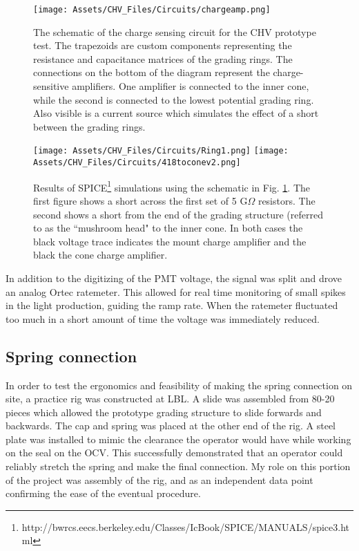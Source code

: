 \begin{figure}
    \centering
    \texttt{[image: Assets/CHV\_Files/Circuits/chargeamp.png]}
    \caption[The schematic of the  charge sensing circuit for the CHV prototype test. ]%
    {The schematic of the  charge sensing circuit for the CHV prototype test. 
    The trapezoids are custom components representing the resistance and capacitance matrices of the grading rings.
    The connections on the bottom of the diagram represent the charge-sensitive amplifiers.
    One amplifier is connected to the inner cone, while the second is connected to the lowest potential grading ring.
    Also visible is a current source which simulates the effect of a short between the grading rings.
    }
    \label{fig:charge_sensing_circuit}
\end{figure}
\begin{figure}
    \centering
    \texttt{[image: Assets/CHV\_Files/Circuits/Ring1.png]}
        \texttt{[image: Assets/CHV\_Files/Circuits/418toconev2.png]}

    \caption[Results of SPICE simulations using the schematic in Fig. \ref{fig:charge_sensing_circuit}.]%
    {Results of SPICE\footnote{http://bwrcs.eecs.berkeley.edu/Classes/IcBook/SPICE/MANUALS/spice3.html} simulations using the schematic in Fig. \ref{fig:charge_sensing_circuit}.
    The first figure shows a short across the first set of 5 G$\Omega$ resistors.
    The second shows a short from the end of the grading structure (referred to as the ``mushroom head" to the inner cone. 
    In both cases the black voltage trace indicates the mount charge amplifier and the black the cone charge amplifier. 
    }
    \label{fig:chargeamp_sims}
\end{figure}

In addition to the digitizing of the PMT voltage, the signal was split and drove an analog  Ortec ratemeter.
This allowed for real time monitoring of small spikes in the light production, guiding the ramp rate.
When the ratemeter fluctuated too much in a short amount of time the voltage was immediately reduced.

\subsection{Spring connection}

In order to test the ergonomics and feasibility of making the spring connection on site, a practice rig was constructed at LBL.
A slide was assembled from 80-20 pieces which allowed the prototype grading structure to slide forwards and backwards.
The cap and spring was placed at the other end of the rig.
A steel plate was installed to mimic the clearance the operator would have while working on the seal on the OCV.
This successfully demonstrated that an operator could reliably stretch the spring and make the final connection.
My role on this portion of the project was assembly of the rig, and as an independent data point confirming the ease of the eventual procedure.

